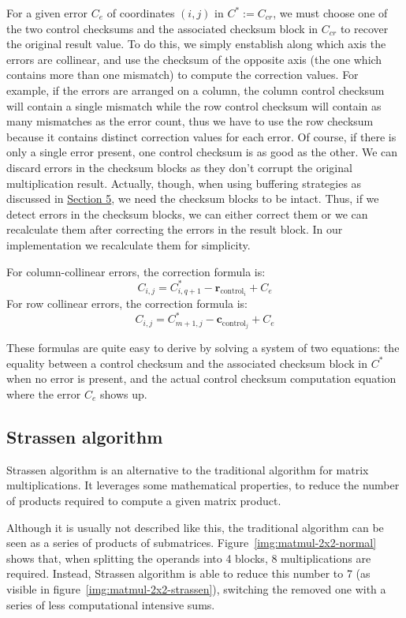 For a given error $C_e$ of coordinates $(i,j)$ in $C^* := C_{cr}$, we must choose one of the two control checksums and the associated checksum block in $C_{cr}$ to recover the original result value.
To do this, we simply enstablish along which axis the errors are collinear, and use the checksum of the opposite axis (the one which contains more than one mismatch) to compute the correction values.
For example, if the errors are arranged on a column, the column control checksum will contain a single mismatch while the row control checksum will contain as many mismatches as the error count, thus we have to use the row checksum because it contains distinct correction values for each error.
Of course, if there is only a single error present, one control checksum is as good as the other.
We can discard errors in the checksum blocks
as they don't corrupt the original multiplication result.
Actually, though, when using buffering strategies as discussed in \hyperref[sec:strategies]{Section 5}, we need the checksum blocks to be intact. Thus, if we detect errors in the checksum blocks, we can either correct them or we can
recalculate them after correcting the errors in the result block.
In our implementation we recalculate them for simplicity.

For column-collinear errors, the correction formula is:
\[
  C_{i,j} = C^*_{i,q+1} - \mathbf{r}_{\text{control}_{i}} + C_e
\]
For row collinear errors, the correction formula is:
\[
  C_{i,j} = C^*_{m+1,j} - \mathbf{c}_{\text{control}_{j}} + C_e
\]

These formulas are quite easy to derive by solving a system of two equations:
the equality between a control checksum and the associated checksum block in $C^*$ when no error is present,
and the actual control checksum computation equation where the error $C_e$ shows up.

\subsection{Strassen algorithm}

Strassen algorithm is an alternative to the traditional algorithm for matrix multiplications.
It leverages some mathematical properties, to reduce the number of products required to compute a given matrix product.

Although it is usually not described like this, the traditional algorithm can be seen as a series of products of submatrices.
Figure~\ref{img:matmul-2x2-normal} shows that, when splitting the operands into 4 blocks, 8 multiplications are required.
Instead, Strassen algorithm is able to reduce this number to 7 (as visible in figure~\ref{img:matmul-2x2-strassen}), switching the removed one with a series of less computational intensive sums.

